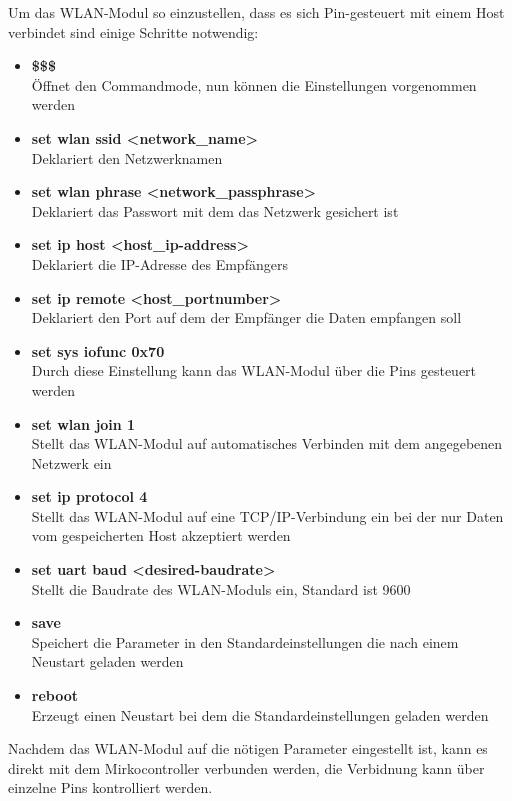 Um das WLAN-Modul so einzustellen, dass es sich Pin-gesteuert mit einem Host verbindet sind einige Schritte notwendig:
  \begin{itemize}
    \item \textbf{\$\$\$}\\
    Öffnet den Commandmode, nun können die Einstellungen vorgenommen werden
    \item \textbf{set wlan ssid <network\_name>}\\
    Deklariert den Netzwerknamen
    \item \textbf{set wlan phrase <network\_passphrase>}\\
    Deklariert das Passwort mit dem das Netzwerk gesichert ist
    \item \textbf{set ip host <host\_ip-address>}\\
    Deklariert die IP-Adresse des Empfängers
    \item \textbf{set ip remote <host\_portnumber>}\\
    Deklariert den Port auf dem der Empfänger die Daten empfangen soll
    \item \textbf{set sys iofunc 0x70}\\
    Durch diese Einstellung kann das WLAN-Modul über die Pins gesteuert werden
    \item \textbf{set wlan join 1}\\
    Stellt das WLAN-Modul auf automatisches Verbinden mit dem angegebenen Netzwerk ein
    \item \textbf{set ip protocol 4}\\
    Stellt das WLAN-Modul auf eine TCP/IP-Verbindung ein bei der nur Daten vom gespeicherten Host akzeptiert werden
    \item \textbf{set uart baud <desired-baudrate>}\\
    Stellt die Baudrate des WLAN-Moduls ein, Standard ist 9600
    \item \textbf{save}\\
    Speichert die Parameter in den Standardeinstellungen die nach einem Neustart geladen werden
    \item \textbf{reboot}\\
    Erzeugt einen Neustart bei dem die Standardeinstellungen geladen werden
  \end{itemize}
  Nachdem das WLAN-Modul auf die nötigen Parameter eingestellt ist, kann es direkt mit dem Mirkocontroller verbunden werden, die Verbidnung kann über einzelne Pins kontrolliert
  werden.

